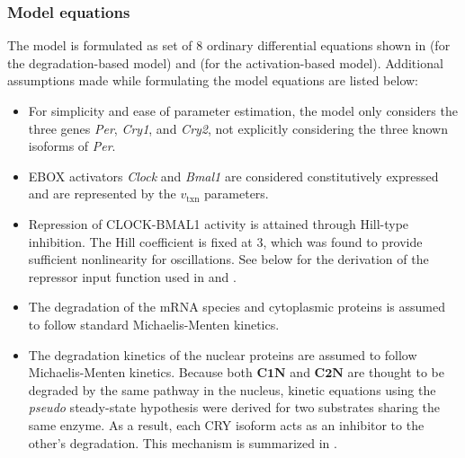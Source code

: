 \subsubsection{Model equations}
The model is formulated as set of 8 ordinary differential equations shown in  (for the degradation-based model) and  (for the activation-based model). 
Additional assumptions made while formulating the model equations are listed below:

\begin{itemize}

  \item For simplicity and  ease of parameter estimation, the model only considers the three genes {\it Per}, {\it Cry1}, and {\it Cry2}, not explicitly considering the three known isoforms of {\it Per}. 

  \item EBOX activators {\it Clock} and {\it Bmal1} are considered constitutively expressed and are represented by the $v_{\text{txn}}$ parameters. 

  \item Repression of CLOCK-BMAL1 activity is attained through Hill-type inhibition. The Hill coefficient is fixed at 3, which was found to provide sufficient nonlinearity for oscillations. See below for the derivation of the repressor input function used in  and .

  \item The degradation of the mRNA species and cytoplasmic proteins is assumed to follow standard Michaelis-Menten kinetics.

  \item The degradation kinetics of the nuclear proteins are assumed to follow Michaelis-Menten kinetics. Because both $\bm{C1N}$ and $\bm{C2N}$ are thought to be degraded by the same pathway in the nucleus, kinetic equations using the {\it pseudo} steady-state hypothesis were derived for two substrates sharing the same enzyme. As a result, each CRY isoform acts as an inhibitor to the other's degradation. This mechanism is summarized in .
\end{itemize}

